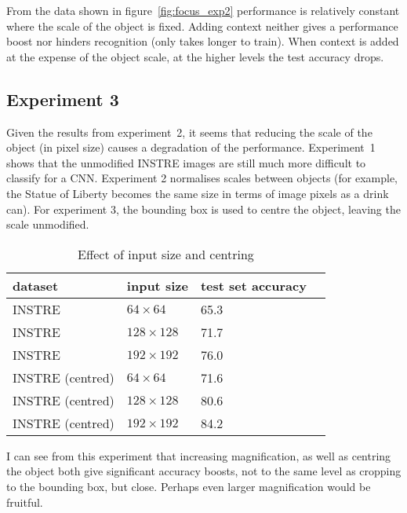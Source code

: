 From the data shown in figure~\ref{fig:focus_exp2} performance is relatively constant where the scale of the object is fixed. Adding context neither gives a performance boost nor hinders recognition (only takes longer to train). When context is added at the expense of the object scale, at the higher levels the test accuracy drops.


\subsection {Experiment 3}

Given the results from experiment~2, it seems that reducing the scale of the object (in pixel size) causes a degradation of the performance. Experiment~1 shows that the unmodified INSTRE images are still much more difficult to classify for a CNN. Experiment 2 normalises scales between objects (for example, the Statue of Liberty becomes the same size in terms of image pixels as a drink can). For experiment 3, the bounding box is used to centre the object, leaving the scale unmodified.


\begin{table}[h]
  \centering
    \caption{Effect of input size and centring}
    
  \begin{tabular}{ l l l l }
    
    dataset & input size & test set accuracy \\
    \toprule
    
    INSTRE &  $ 64 \times 64 $ & 65.3 \\
    INSTRE &  $ 128 \times 128 $  & 71.7 \\
    INSTRE &  $ 192 \times 192 $  & 76.0 \\
    
    \toprule
    INSTRE (centred) &  $ 64 \times 64 $ & 71.6 \\
    INSTRE (centred) &  $ 128 \times 128 $  & 80.6 \\
    INSTRE (centred) &  $ 192 \times 192 $  & 84.2 \\
    
    
    
    \bottomrule
  \end{tabular}
\label{fig:focus_input_size}
\end{table}



I can see from this experiment that increasing magnification, as well as centring the object both give significant accuracy boosts, not to the same level as cropping to the bounding box, but close. Perhaps even larger magnification would be fruitful. 

